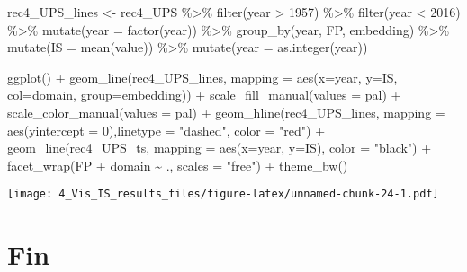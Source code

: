 \documentclass[
]{article}
\newenvironment{Shaded}{\begin{snugshade}}{\end{snugshade}}
\newcommand{\AttributeTok}[1]{\textcolor[rgb]{0.77,0.63,0.00}{#1}}
\newcommand{\DecValTok}[1]{\textcolor[rgb]{0.00,0.00,0.81}{#1}}
\newcommand{\FunctionTok}[1]{\textcolor[rgb]{0.00,0.00,0.00}{#1}}
\newcommand{\NormalTok}[1]{#1}
\newcommand{\OtherTok}[1]{\textcolor[rgb]{0.56,0.35,0.01}{#1}}
\newcommand{\SpecialCharTok}[1]{\textcolor[rgb]{0.00,0.00,0.00}{#1}}
\newcommand{\StringTok}[1]{\textcolor[rgb]{0.31,0.60,0.02}{#1}}
\begin{document}
\begin{Shaded}
\begin{Highlighting}[]
\NormalTok{rec4\_UPS\_lines }\OtherTok{\textless{}{-}}\NormalTok{ rec4\_UPS }\SpecialCharTok{\%\textgreater{}\%} 
  \FunctionTok{filter}\NormalTok{(year }\SpecialCharTok{\textgreater{}} \DecValTok{1957}\NormalTok{) }\SpecialCharTok{\%\textgreater{}\%}
  \FunctionTok{filter}\NormalTok{(year }\SpecialCharTok{\textless{}} \DecValTok{2016}\NormalTok{) }\SpecialCharTok{\%\textgreater{}\%} 
  \FunctionTok{mutate}\NormalTok{(}\AttributeTok{year =} \FunctionTok{factor}\NormalTok{(year)) }\SpecialCharTok{\%\textgreater{}\%} 
  \FunctionTok{group\_by}\NormalTok{(year, FP, embedding) }\SpecialCharTok{\%\textgreater{}\%} 
  \FunctionTok{mutate}\NormalTok{(}\AttributeTok{IS =} \FunctionTok{mean}\NormalTok{(value)) }\SpecialCharTok{\%\textgreater{}\%} 
  \FunctionTok{mutate}\NormalTok{(}\AttributeTok{year =} \FunctionTok{as.integer}\NormalTok{(year))}


\FunctionTok{ggplot}\NormalTok{() }\SpecialCharTok{+}
  \FunctionTok{geom\_line}\NormalTok{(rec4\_UPS\_lines, }\AttributeTok{mapping =} \FunctionTok{aes}\NormalTok{(}\AttributeTok{x=}\NormalTok{year, }\AttributeTok{y=}\NormalTok{IS, }\AttributeTok{col=}\NormalTok{domain, }\AttributeTok{group=}\NormalTok{embedding)) }\SpecialCharTok{+} 
  \FunctionTok{scale\_fill\_manual}\NormalTok{(}\AttributeTok{values =}\NormalTok{ pal) }\SpecialCharTok{+}
  \FunctionTok{scale\_color\_manual}\NormalTok{(}\AttributeTok{values =}\NormalTok{ pal) }\SpecialCharTok{+}
  \FunctionTok{geom\_hline}\NormalTok{(rec4\_UPS\_lines, }\AttributeTok{mapping =} \FunctionTok{aes}\NormalTok{(}\AttributeTok{yintercept =} \DecValTok{0}\NormalTok{),}\AttributeTok{linetype =} \StringTok{"dashed"}\NormalTok{, }\AttributeTok{color =} \StringTok{"red"}\NormalTok{) }\SpecialCharTok{+}
  \FunctionTok{geom\_line}\NormalTok{(rec4\_UPS\_ts, }\AttributeTok{mapping =} \FunctionTok{aes}\NormalTok{(}\AttributeTok{x=}\NormalTok{year, }\AttributeTok{y=}\NormalTok{IS), }\AttributeTok{color =} \StringTok{"black"}\NormalTok{) }\SpecialCharTok{+}
  \FunctionTok{facet\_wrap}\NormalTok{(FP }\SpecialCharTok{+}\NormalTok{ domain }\SpecialCharTok{\textasciitilde{}}\NormalTok{ ., }\AttributeTok{scales =} \StringTok{"free"}\NormalTok{) }\SpecialCharTok{+}
  \FunctionTok{theme\_bw}\NormalTok{()}
\end{Highlighting}
\end{Shaded}

\texttt{[image: 4\_Vis\_IS\_results\_files/figure-latex/unnamed-chunk-24-1.pdf]}

\hypertarget{fin}{%
\section{Fin}\label{fin}}
\end{document}
